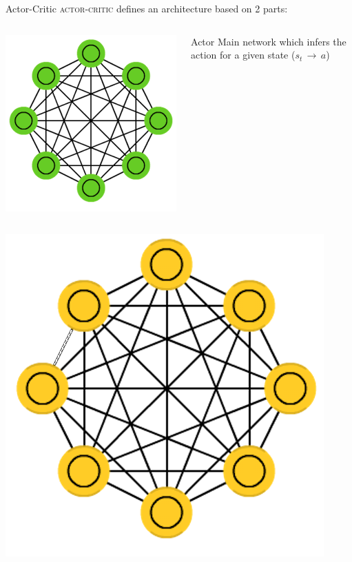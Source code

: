 \documentclass[aspectratio=169]{beamer}
\begin{document}
\begin{frame}{Actor-Critic}
	\textsc{actor-critic} defines an architecture based on 2 parts:
	\begin{columns}[T]
		\begin{column}{0.1\textwidth}
		\includegraphics[scale=0.2]{img/agreen.png}
		\end{column}
		\begin{column}{0.7\textwidth}
			\begin{alertblock}{Actor}
			Main network which infers the action for a given state ($s_t\,\rightarrow\, a$)
			\end{alertblock}
		\end{column}
	\end{columns}
	\vfill
	\begin{columns}[T]
		\begin{column}{0.1\textwidth}
		\includegraphics[scale=0.2]{img/ayellow.png}

\end{column}
\end{columns}
\end{frame}
\end{document}
